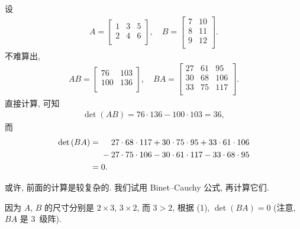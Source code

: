 \documentclass[../libro.tex]{subfiles}
\begin{document}
\begin{example}
    设
    \begin{align*}
        A =
        \begin{bmatrix}
            1 & 3 & 5 \\
            2 & 4 & 6 \\
        \end{bmatrix},
        \quad
        B =
        \begin{bmatrix}
            7 & 10 \\
            8 & 11 \\
            9 & 12 \\
        \end{bmatrix}.
    \end{align*}
    不难算出,
    \begin{align*}
        AB =
        \begin{bmatrix}
            76  & 103 \\
            100 & 136 \\
        \end{bmatrix},
        \quad
        BA =
        \begin{bmatrix}
            27 & 61 & 95  \\
            30 & 68 & 106 \\
            33 & 75 & 117 \\
        \end{bmatrix}.
    \end{align*}
    直接计算, 可知
    \begin{align*}
        \det {(AB)} = 76 \cdot 136 - 100 \cdot 103 = 36,
    \end{align*}
    而
    \begin{align*}
        \det {(BA)}
        = {} & \hphantom{{} + {}}
        27 \cdot 68 \cdot 117
        + 30 \cdot 75 \cdot 95
        + 33 \cdot 61 \cdot 106
        \\
        &
        - 27 \cdot 75 \cdot 106
        - 30 \cdot 61 \cdot 117
        - 33 \cdot 68 \cdot 95
        \\
        = {} & 0.
    \end{align*}

    或许, 前面的计算是较复杂的.
    我们试用 Binet--Cauchy 公式, 再计算它们.

    因为 \(A\), \(B\) 的尺寸分别是 \(2 \times 3\), \(3 \times 2\),
    而 \(3 > 2\),
    根据 (1), \(\det {(BA)} = 0\)
    (注意, \(BA\) 是 \(3\)~级阵).


\end{example}
\end{document}
